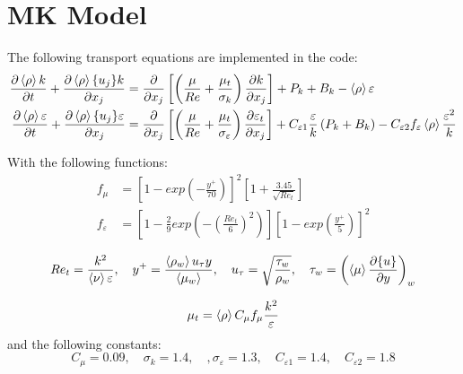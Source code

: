 



\section{MK Model}
The following transport equations are implemented in the code:
\begin{equation} \label{eq:ktDeng}
\begin{split}
\frac{\partial \left<{\rho}\right> k}{\partial { t}} + \frac{\partial \left<{\rho}\right> \{{u_j}\} k}{\partial {x_j}} &= \frac{\partial}{\partial x_j}\left[\left(\frac{\mu}{Re} + \frac{\mu_t}{\sigma_k}\right)\frac{\partial k}{\partial {x_j}}\right] + P_{k} + B_k- \left<{\rho}\right>\varepsilon \\
\frac{\partial  \left<{\rho}\right> \varepsilon}{\partial {t}} + \frac{\partial  \left<{\rho}\right> \{{u_j}\} \varepsilon}{\partial { x_j}} &= \frac{\partial}{\partial x_j}\left[ \left(\frac{\mu}{Re} + \frac{\mu_t}{\sigma_{\varepsilon}}\right)\frac{\partial  \varepsilon_t}{\partial {x_j}}\right] + C_{\varepsilon1}\frac{\varepsilon}{k}\left(P_k+B_k\right)  -C_{\varepsilon2} f_{\varepsilon}\left<{\rho}\right>\frac{\varepsilon^2}{k}   
\end{split}
\end{equation}

With the following functions:
\begin{equation}
\begin{split}
    f_\mu &= \left[1-exp\left(-\frac{y^+}{70}\right)\right]^2\left[1+\frac{3.45}{\sqrt{Re_t}}\right] \\
    f_\varepsilon  &=\left[1-\frac{2}{9}exp\left(-\left(\frac{Re_t}{6}\right)^2\right)\right] \left[1-exp\left(\frac{y^+}{5}\right)\right]^2 
\end{split}
\end{equation}

\begin{equation}
Re_t = \frac{k^2}{\left<{\nu}\right> \varepsilon}, \quad y^+ =  \frac{\left<{\rho_w}\right> u_\tau y }{\left<{\mu_w}\right>}, \quad u_\tau = \sqrt{\frac{\tau_w}{\rho_w}}, \quad \tau_w = \left(\left<{\mu}\right>\frac{\partial  \{{u}\}}{\partial {y}}\right)_w
\end{equation}

\begin{equation}
\mu_t = \left<{\rho}\right> C_\mu f_\mu \frac{k^2}{\varepsilon}
\end{equation}
and the following constants:
\begin{equation}
C_\mu = 0.09, \quad \sigma_k = 1.4, \quad, \sigma_\varepsilon = 1.3, \quad C_{\varepsilon1} = 1.4, \quad C_{\varepsilon2}=1.8
\end{equation}
